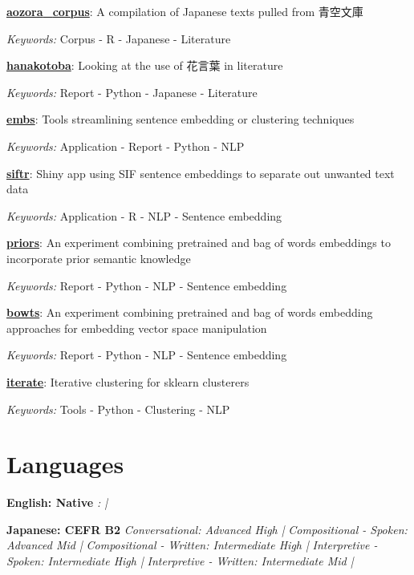 \documentclass[a4paper,9pt]{extarticle}
\begin{document}
\noindent\textbf{\href{https://github.com/ryancahildebrandt/aozora_corpus}{aozora{\_}corpus}}: A compilation of Japanese texts pulled from 青空文庫

\textit{Keywords:} Corpus - R - Japanese - Literature

\noindent\textbf{\href{https://github.com/ryancahildebrandt/hanakotoba}{hanakotoba}}: Looking at the use of 花言葉 in literature 

\textit{Keywords:} Report - Python - Japanese - Literature

\noindent\textbf{\href{https://github.com/ryancahildebrandt/embs}{embs}}: Tools streamlining sentence embedding or clustering techniques

\textit{Keywords:} Application - Report - Python - NLP

\noindent\textbf{\href{https://github.com/ryancahildebrandt/siftr}{siftr}}: Shiny app using SIF sentence embeddings to separate out unwanted text data

\textit{Keywords:} Application - R - NLP - Sentence embedding

\noindent\textbf{\href{https://github.com/ryancahildebrandt/priors}{priors}}: An experiment combining pretrained and bag of words embeddings to incorporate prior semantic knowledge

\textit{Keywords:} Report - Python - NLP - Sentence embedding

\noindent\textbf{\href{https://github.com/ryancahildebrandt/bowts}{bowts}}: An experiment combining pretrained and bag of words embedding approaches for embedding vector space manipulation

\textit{Keywords:} Report - Python - NLP - Sentence embedding

\noindent\textbf{\href{https://github.com/ryancahildebrandt/iterate}{iterate}}: Iterative clustering for sklearn clusterers

\textit{Keywords:} Tools - Python - Clustering - NLP

\section*{Languages}
\noindent\textbf{English: Native}
\textit{:  |}

\noindent\textbf{Japanese: CEFR B2}
\textit{Conversational: Advanced High |}
\textit{Compositional - Spoken: Advanced Mid |}
\textit{Compositional - Written: Intermediate High |}
\textit{Interpretive - Spoken: Intermediate High |}
\textit{Interpretive - Written: Intermediate Mid |}
\end{document}
